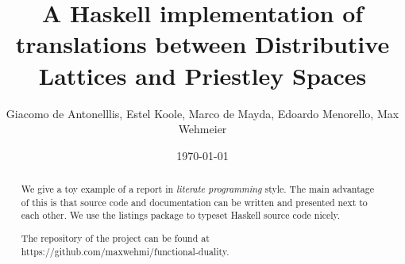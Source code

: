 \documentclass[12pt,a4paper]{article}
\title{A Haskell implementation of translations between Distributive Lattices and Priestley Spaces}
\author{Giacomo de Antonelllis, Estel Koole, Marco de Mayda, Edoardo Menorello, Max Wehmeier}
\date{\today}
\begin{document}
\maketitle

\begin{abstract}
We give a toy example of a report in \emph{literate programming} style.
The main advantage of this is that source code and documentation can
be written and presented next to each other.
We use the listings package to typeset Haskell source code nicely.

The repository of the project can be found at https://github.com/maxwehmi/functional-duality.
\end{abstract}

\vfill

\tableofcontents

\clearpage


















\end{document}
